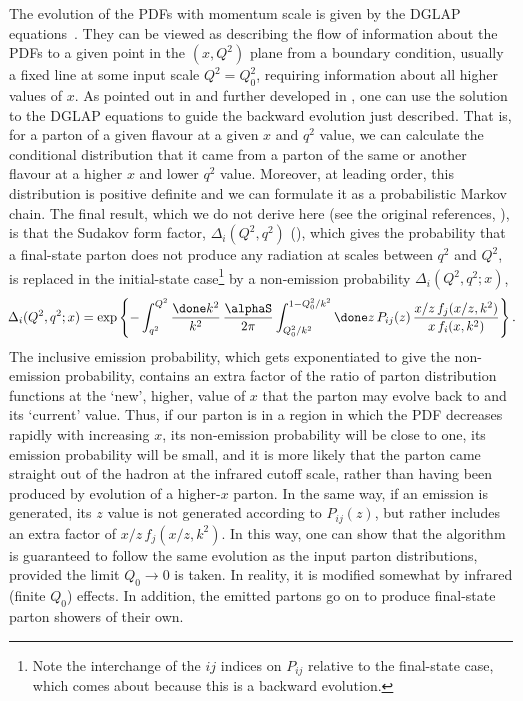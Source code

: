 The evolution of the PDFs with momentum
scale is given by the DGLAP
equations~\cite{Gribov:1972ri,Dokshitzer:1977sg,Altarelli:1977zs}.  They
can be viewed as
describing the flow of information about the PDFs to a given point in the
$(x,Q^2)$ plane from a boundary condition, usually a fixed line at some
input scale $Q^2=Q_0^2$, requiring information about all higher values
of $x$.  As pointed out in \cite{Sjostrand:1985xi} and further developed in
\cite{Marchesini:1987cf}, one can use the solution to the DGLAP
equations to guide the
backward evolution just described.  That is, for a parton of a given
flavour at a given $x$ and $q^2$ value, we can calculate the conditional
distribution that it came from a parton of the same or another flavour
at a higher $x$ and lower $q^2$ value.  Moreover, at leading order, this
distribution is positive definite and we can formulate it as a
probabilistic Markov chain.  The final result, which we do not derive
here (see the original references, \cite{Sjostrand:1985xi,Marchesini:1987cf}), is that the Sudakov form
factor, $\Delta_i(Q^2,q^2)$
(), which gives the probability that a final-state parton
does not produce any radiation at scales between $q^2$ and $Q^2$, is
replaced in the initial-state case\footnote{Note the interchange of the
  $ij$ indices on $P_{ij}$ relative to the final-state case, which comes
  about because this is a backward evolution.} by a non-emission
probability $\Delta_i(Q^2,q^2;x)$,
\begin{equation}
  \label{ISRsudakov}
  \!
  \Delta_i(Q^2,q^2;x) = \exp\left\{-\int_{q^2}^{Q^2}\frac{\done k^2}{k^2}\,
  \frac{\alphaS}{2\pi} \int_{Q_0^2/k^2}^{1-Q_0^2/k^2}\done z\,P_{ij}(z)
  \, \frac{x/z\,f_j(x/z,k^2)}{x\,f_i(x,k^2)}
  \right\}.
  \!\!
\end{equation}
The inclusive emission probability, which gets exponentiated to give the
non-emission probability, contains an extra factor of the ratio of
parton distribution functions at the `new', higher, value of $x$ that
the parton may evolve back to and its `current' value.
Thus, if our parton is in a region
in which the PDF decreases rapidly with increasing $x$, its non-emission
probability will be close to one, \ie its emission probability will be
small, and it is more likely that the parton came straight out of the
hadron at the infrared cutoff scale, rather than having been produced by
evolution of a higher-$x$ parton.  In the same way, if an emission is
generated, its $z$ value is not generated according to $P_{ij}(z)$, but
rather includes an extra factor of $x/z\,f_j(x/z,k^2)$.  In this way, one
can show that the algorithm is guaranteed to follow the same evolution
as the input parton distributions, provided the limit $Q_0\to0$ is
taken.  In reality, it is modified somewhat by infrared (\ie finite
$Q_0$) effects.  In addition, the emitted partons go on to produce
final-state parton showers of their own.

